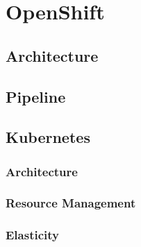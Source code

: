 \chapter{OpenShift}
\label{chp:openshift}

\lipsum[1]


\section{Architecture}
\label{sec:openshift-architecture}

\lipsum[1]


\section{Pipeline}
\label{sec:openshift-pipeline}

\lipsum[1]


\section{Kubernetes}
\label{sec:kubernetes}


\lipsum[1]


\subsection{Architecture}
\label{sec:kubernetes-architecture}

\lipsum[1]


\subsection{Resource Management}
\label{sec:kubernetes-resource-management}

\lipsum[1]


\subsection{Elasticity}
\label{sec:kubernetes-elasticity}

\lipsum[1]